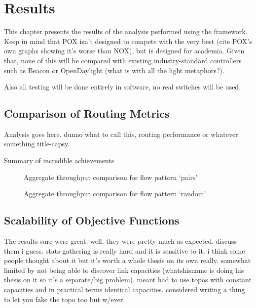 \chapter{Results}

This chapter presents the results of the analysis performed using the framework. Keep in mind that POX isn't designed to compete with the very best (cite POX's own graphs showing it's worse than NOX), but is designed for academia. Given that, none of this will be compared with existing industry-standard controllers such as Beacon or OpenDaylight (what is with all the light metaphors?).

Also all testing will be done entirely in software, no real switches will be used.

\section{Comparison of Routing Metrics}
Analysis goes here. dunno what to call this, routing performance or whatever. something title-capsy.


\begin{table}
\caption{Summary of incredible achievements}
\end{table}

\begin{figure}
\centering

\caption{Aggregate throughput comparison for flow pattern `pairs'}
\label{fig:pairs}
\end{figure}

\begin{figure}
\centering

\caption{Aggregate throughput comparison for flow pattern `random'}
\label{fig:random}
\end{figure}

\section{Scalability of Objective Functions}
The results sure were great.
well. they were pretty much as expected. discuss them i guess.
stats-gathering is really hard and it is sensitive to it. i think some people thought
about it but it's worth a whole thesis on its own really.
somewhat limited by not being able to discover link capacities (whatshisname is
doing his thesis on it so it’s a separate/big problem). meant had to use topos with
constant capacities and in practical terms identical capacities. considered writing a
thing to let you fake the topo too but w/ever.

